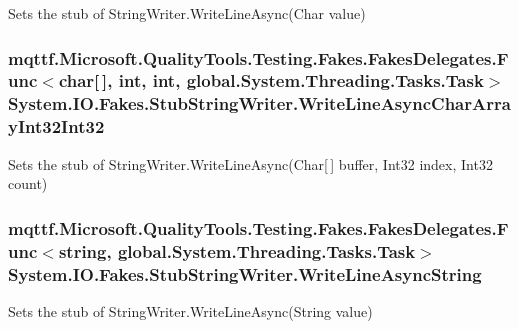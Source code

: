 Sets the stub of String\-Writer.\-Write\-Line\-Async(\-Char value)

\hypertarget{class_system_1_1_i_o_1_1_fakes_1_1_stub_string_writer_a62d638b24846379b91ec0bdd220d97c2}{
\subsubsection[{Write\-Line\-Async\-Char\-Array\-Int32\-Int32}]{\setlength{\rightskip}{0pt plus 5cm}mqttf.\-Microsoft.\-Quality\-Tools.\-Testing.\-Fakes.\-Fakes\-Delegates.\-Func$<$char\mbox{[}$\,$\mbox{]}, int, int, global.\-System.\-Threading.\-Tasks.\-Task$>$ System.\-I\-O.\-Fakes.\-Stub\-String\-Writer.\-Write\-Line\-Async\-Char\-Array\-Int32\-Int32}}\label{class_system_1_1_i_o_1_1_fakes_1_1_stub_string_writer_a62d638b24846379b91ec0bdd220d97c2}


Sets the stub of String\-Writer.\-Write\-Line\-Async(\-Char\mbox{[}$\,$\mbox{]} buffer, Int32 index, Int32 count)

\hypertarget{class_system_1_1_i_o_1_1_fakes_1_1_stub_string_writer_a876b1ef3d98d9b43bb8c4171b86e2a8c}{
\subsubsection[{Write\-Line\-Async\-String}]{\setlength{\rightskip}{0pt plus 5cm}mqttf.\-Microsoft.\-Quality\-Tools.\-Testing.\-Fakes.\-Fakes\-Delegates.\-Func$<$string, global.\-System.\-Threading.\-Tasks.\-Task$>$ System.\-I\-O.\-Fakes.\-Stub\-String\-Writer.\-Write\-Line\-Async\-String}}\label{class_system_1_1_i_o_1_1_fakes_1_1_stub_string_writer_a876b1ef3d98d9b43bb8c4171b86e2a8c}


Sets the stub of String\-Writer.\-Write\-Line\-Async(\-String value)

